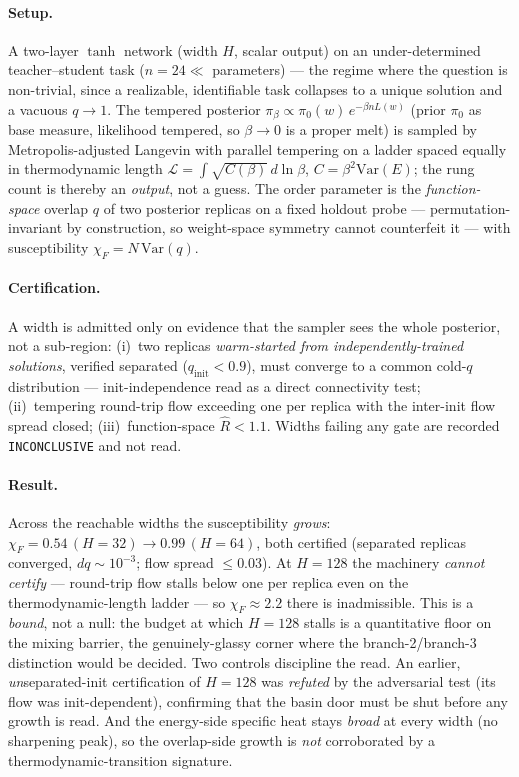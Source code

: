 \documentclass[a4paper,11pt]{article}
\theoremstyle{plain}
\theoremstyle{definition}
\theoremstyle{remark}
\begin{document}
\paragraph{Setup.} A two-layer $\tanh$ network (width $H$, scalar output) on an under-determined
teacher--student task ($n=24\ll$ parameters) --- the regime where the question is non-trivial, since a
realizable, identifiable task collapses to a unique solution and a vacuous $q\to1$. The tempered posterior
$\pi_\beta\propto\pi_0(w)\,e^{-\beta nL(w)}$ (prior $\pi_0$ as base measure, likelihood tempered, so
$\beta\to0$ is a proper melt) is sampled by Metropolis-adjusted Langevin with parallel tempering on a ladder
spaced equally in thermodynamic length $\mathcal L=\int\sqrt{C(\beta)}\,d\ln\beta$, $C=\beta^2\mathrm{Var}(E)$;
the rung count is thereby an \emph{output}, not a guess. The order parameter is the \emph{function-space}
overlap $q$ of two posterior replicas on a fixed holdout probe --- permutation-invariant by construction, so
weight-space symmetry cannot counterfeit it --- with susceptibility $\chi_F=N\,\mathrm{Var}(q)$.

\paragraph{Certification.} A width is admitted only on evidence that the sampler sees the whole posterior, not
a sub-region: (i)~two replicas \emph{warm-started from independently-trained solutions}, verified separated
($q_{\mathrm{init}}<0.9$), must converge to a common cold-$q$ distribution --- init-independence read as a
direct connectivity test; (ii)~tempering round-trip flow exceeding one per replica with the inter-init flow
spread closed; (iii)~function-space $\hat R<1.1$. Widths failing any gate are recorded \texttt{INCONCLUSIVE}
and not read.

\paragraph{Result.} Across the reachable widths the susceptibility \emph{grows}:
$\chi_F=0.54\,(H{=}32)\to0.99\,(H{=}64)$, both certified (separated replicas converged, $dq\sim10^{-3}$; flow
spread $\le0.03$). At $H{=}128$ the machinery \emph{cannot certify} --- round-trip flow stalls below one per
replica even on the thermodynamic-length ladder --- so $\chi_F\approx2.2$ there is inadmissible. This is a
\emph{bound}, not a null: the budget at which $H{=}128$ stalls is a quantitative floor on the mixing barrier,
the genuinely-glassy corner where the branch-2/branch-3 distinction would be decided. Two controls discipline
the read. An earlier, \emph{un}separated-init certification of $H{=}128$ was \emph{refuted} by the adversarial
test (its flow was init-dependent), confirming that the basin door must be shut before any growth is read.
And the energy-side specific heat stays \emph{broad} at every width (no sharpening peak), so the overlap-side
growth is \emph{not} corroborated by a thermodynamic-transition signature.
\end{document}
